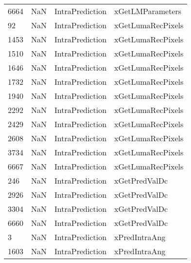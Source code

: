 \begin{tabular}{llll}
6664 &                   NaN &            IntraPrediction &                          xGetLMParameters \\
92   &                   NaN &            IntraPrediction &                         xGetLumaRecPixels \\
1453 &                   NaN &            IntraPrediction &                         xGetLumaRecPixels \\
1510 &                   NaN &            IntraPrediction &                         xGetLumaRecPixels \\
1646 &                   NaN &            IntraPrediction &                         xGetLumaRecPixels \\
1732 &                   NaN &            IntraPrediction &                         xGetLumaRecPixels \\
1940 &                   NaN &            IntraPrediction &                         xGetLumaRecPixels \\
2292 &                   NaN &            IntraPrediction &                         xGetLumaRecPixels \\
2429 &                   NaN &            IntraPrediction &                         xGetLumaRecPixels \\
2608 &                   NaN &            IntraPrediction &                         xGetLumaRecPixels \\
3734 &                   NaN &            IntraPrediction &                         xGetLumaRecPixels \\
6667 &                   NaN &            IntraPrediction &                         xGetLumaRecPixels \\
246  &                   NaN &            IntraPrediction &                             xGetPredValDc \\
2926 &                   NaN &            IntraPrediction &                             xGetPredValDc \\
3304 &                   NaN &            IntraPrediction &                             xGetPredValDc \\
6660 &                   NaN &            IntraPrediction &                             xGetPredValDc \\
3    &                   NaN &            IntraPrediction &                             xPredIntraAng \\
1603 &                   NaN &            IntraPrediction &                             xPredIntraAng \\

\end{tabular}
